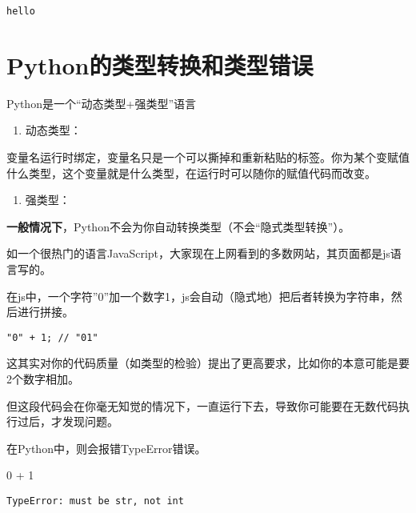 \documentclass[
  letterpaper,
  DIV=11,
  numbers=noendperiod]{scrreprt}
\newenvironment{Shaded}{\begin{snugshade}}{\end{snugshade}}
\newcommand{\CommentTok}[1]{\textcolor[rgb]{0.37,0.37,0.37}{#1}}
\newcommand{\DecValTok}[1]{\textcolor[rgb]{0.68,0.00,0.00}{#1}}
\newcommand{\OperatorTok}[1]{\textcolor[rgb]{0.37,0.37,0.37}{#1}}
\providecommand{\tightlist}{%
  \setlength{\itemsep}{0pt}\setlength{\parskip}{0pt}}\usepackage{longtable,booktabs,array}
\begin{document}
\begin{verbatim}
hello
\end{verbatim}

\hypertarget{pythonux7684ux7c7bux578bux8f6cux6362ux548cux7c7bux578bux9519ux8bef}{%
\section{Python的类型转换和类型错误}\label{pythonux7684ux7c7bux578bux8f6cux6362ux548cux7c7bux578bux9519ux8bef}}

Python是一个``动态类型+强类型''语言

\begin{enumerate}
\def\labelenumi{\arabic{enumi}.}
\tightlist
\item
  动态类型：
\end{enumerate}

变量名运行时绑定，变量名只是一个可以撕掉和重新粘贴的标签。你为某个变赋值什么类型，这个变量就是什么类型，在运行时可以随你的赋值代码而改变。

\begin{enumerate}
\def\labelenumi{\arabic{enumi}.}
\setcounter{enumi}{1}
\tightlist
\item
  强类型：
\end{enumerate}

\textbf{一般情况下}，Python不会为你自动转换类型（不会``隐式类型转换''）。

如一个很热门的语言JavaScript，大家现在上网看到的多数网站，其页面都是js语言写的。

在js中，一个字符''0''加一个数字1，js会自动（隐式地）把后者转换为字符串，然后进行拼接。

\begin{verbatim}
"0" + 1; // "01"
\end{verbatim}

这其实对你的代码质量（如类型的检验）提出了更高要求，比如你的本意可能是要2个数字相加。

但这段代码会在你毫无知觉的情况下，一直运行下去，导致你可能要在无数代码执行过后，才发现问题。

在Python中，则会报错TypeError错误。

\begin{Shaded}
\begin{Highlighting}[]
\CommentTok{\textquotesingle{}0\textquotesingle{}} \OperatorTok{+} \DecValTok{1}
\end{Highlighting}
\end{Shaded}

\begin{verbatim}
TypeError: must be str, not int
\end{verbatim}
\end{document}
